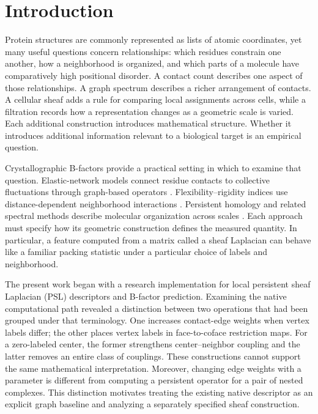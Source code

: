 \documentclass[11pt]{article}
\begin{document}
\section{Introduction}
Protein structures are commonly represented as lists of atomic coordinates, yet many useful questions concern relationships: which residues constrain one another, how a neighborhood is organized, and which parts of a molecule have comparatively high positional disorder. A contact count describes one aspect of those relationships. A graph spectrum describes a richer arrangement of contacts. A cellular sheaf adds a rule for comparing local assignments across cells, while a filtration records how a representation changes as a geometric scale is varied. Each additional construction introduces mathematical structure. Whether it introduces additional information relevant to a biological target is an empirical question.

Crystallographic B-factors provide a practical setting in which to examine that question. Elastic-network models connect residue contacts to collective fluctuations through graph-based operators \citep{haliloglu1997,atilgan2001}. Flexibility--rigidity indices use distance-dependent neighborhood interactions \citep{nguyen2016}. Persistent homology and related spectral methods describe molecular organization across scales \citep{xia2014,wang2020}. Each approach must specify how its geometric construction defines the measured quantity. In particular, a feature computed from a matrix called a sheaf Laplacian can behave like a familiar packing statistic under a particular choice of labels and neighborhood.

The present work began with a research implementation for local persistent sheaf Laplacian (PSL) descriptors and B-factor prediction. Examining the native computational path revealed a distinction between two operations that had been grouped under that terminology. One increases contact-edge weights when vertex labels differ; the other places vertex labels in face-to-coface restriction maps. For a zero-labeled center, the former strengthens center--neighbor coupling and the latter removes an entire class of couplings. These constructions cannot support the same mathematical interpretation. Moreover, changing edge weights with a parameter is different from computing a persistent operator for a pair of nested complexes. This distinction motivates treating the existing native descriptor as an explicit graph baseline and analyzing a separately specified sheaf construction.
\end{document}
